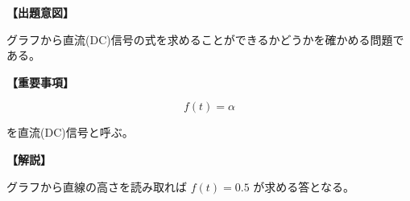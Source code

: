 \noindent \textbf{【出題意図】}

\noindent グラフから直流(DC)信号の式を求めることができるかどうかを確かめる問題である。

\vspace{1em}
\noindent \textbf{【重要事項】}

\[
f(t) = \alpha
\]

\medskip
\noindent を直流(DC)信号と呼ぶ。


\vspace{1em}
\noindent \textbf{【解説】}

\noindent グラフから直線の高さを読み取れば $f(t) = 0.5$ が求める答となる。
